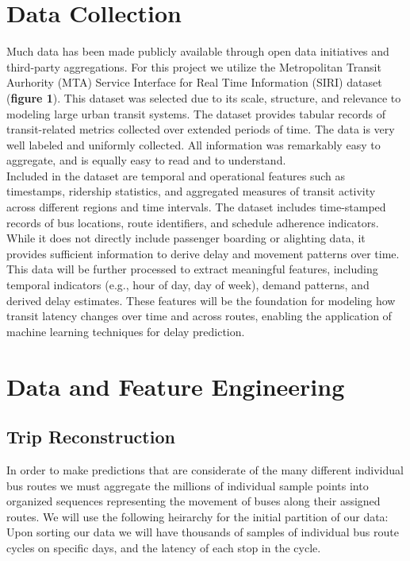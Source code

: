 \documentclass[sigconf]{acmart}
\begin{document}
\section{Data Collection}
Much data has been made publicly available through open data initiatives and third-party aggregations.  For this project we utilize the Metropolitan Transit Aurhority (MTA) Service Interface for Real Time Information (SIRI) dataset (\textbf{figure 1}). This dataset was selected due to its scale, structure, and relevance to modeling large urban transit systems. The dataset provides tabular records of transit-related metrics collected over extended periods of time. The data is very well labeled and uniformly collected. All information was remarkably easy to aggregate, and is equally easy to read and to understand.\\
Included in the dataset are temporal and operational features such as timestamps, ridership statistics, and aggregated measures of transit activity across different regions and time intervals. The dataset includes time-stamped records of bus locations, route identifiers, and schedule adherence indicators. While it does not directly include passenger boarding or alighting data, it provides sufficient information to derive delay and movement patterns over time. 
This data will be further processed to extract meaningful features, including temporal indicators (e.g., hour of day, day of week), demand patterns, and derived delay estimates. These features will be the foundation for modeling how transit latency changes over time and across routes, enabling the application of machine learning techniques for delay prediction.

\section{Data and Feature Engineering}
\subsection{Trip Reconstruction}
In order to make predictions that are considerate of the many different individual bus routes we must aggregate the millions of individual sample points into organized sequences representing the movement of buses along their assigned routes. We will use the following heirarchy for the initial partition of our data:\\

Upon sorting our data we will have thousands of samples of individual bus route cycles on specific days, and the latency of each stop in the cycle.
\end{document}
